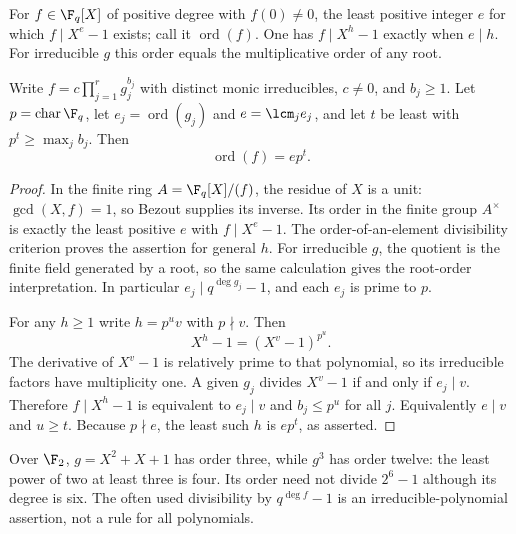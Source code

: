 \begin{theorem}
For $f\in\F_q[X]$ of positive degree with $f(0)\ne0$, the least positive integer $e$ for which $f\mid X^e-1$ exists; call it $\operatorname{ord}(f)$. One has $f\mid X^h-1$ exactly when $e\mid h$. For irreducible $g$ this order equals the multiplicative order of any root.

Write $f=c\prod_{j=1}^r g_j^{b_j}$ with distinct monic irreducibles, $c\ne0$, and $b_j\geq1$. Let $p=\operatorname{char}\F_q$, let $e_j=\operatorname{ord}(g_j)$ and $e=\lcm_j e_j$, and let $t$ be least with $p^t\geq\max_j b_j$. Then
\[\operatorname{ord}(f)=e p^t.\]
\end{theorem}
\begin{proof}
In the finite ring $A=\F_q[X]/(f)$, the residue of $X$ is a unit: $\gcd(X,f)=1$, so Bezout supplies its inverse. Its order in the finite group $A^\times$ is exactly the least positive $e$ with $f\mid X^e-1$. The order-of-an-element divisibility criterion proves the assertion for general $h$. For irreducible $g$, the quotient is the finite field generated by a root, so the same calculation gives the root-order interpretation. In particular $e_j\mid q^{\deg g_j}-1$, and each $e_j$ is prime to $p$.

For any $h\geq1$ write $h=p^u v$ with $p\nmid v$. Then
\[X^h-1=(X^v-1)^{p^u}.\]
The derivative of $X^v-1$ is relatively prime to that polynomial, so its irreducible factors have multiplicity one. A given $g_j$ divides $X^v-1$ if and only if $e_j\mid v$. Therefore $f\mid X^h-1$ is equivalent to $e_j\mid v$ and $b_j\leq p^u$ for all $j$. Equivalently $e\mid v$ and $u\geq t$. Because $p\nmid e$, the least such $h$ is $e p^t$, as asserted.
\end{proof}
\begin{example}
Over $\F_2$, $g=X^2+X+1$ has order three, while $g^3$ has order twelve: the least power of two at least three is four. Its order need not divide $2^6-1$ although its degree is six. The often used divisibility by $q^{\deg f}-1$ is an irreducible-polynomial assertion, not a rule for all polynomials.
\end{example}

